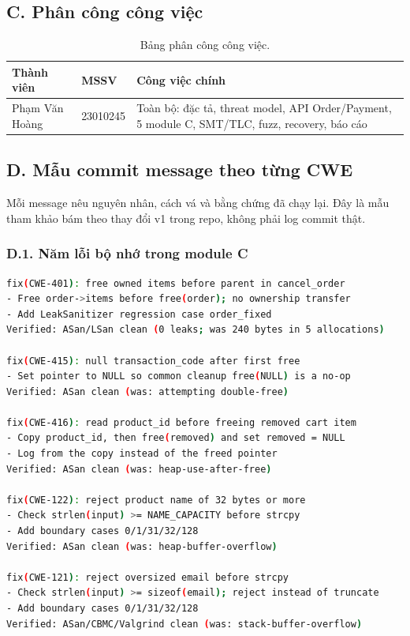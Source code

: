 \documentclass[12pt,a4paper]{article}
\begin{document}
\subsection*{C. Phân công công việc}
\begin{table}[H]
\centering
\small
\renewcommand{\arraystretch}{1.25}
\begin{tabularx}{\textwidth}{@{}L{4.4cm} L{3.2cm} Y@{}}
\toprule
\textbf{Thành viên} & \textbf{MSSV} & \textbf{Công việc chính} \\
\midrule
Phạm Văn Hoàng & 23010245 & Toàn bộ: đặc tả, threat model, API Order/Payment, 5 module C, SMT/TLC, fuzz, recovery, báo cáo \\
\bottomrule
\end{tabularx}
\caption{Bảng phân công công việc.}
\end{table}

\subsection*{D. Mẫu commit message theo từng CWE}
Mỗi message nêu nguyên nhân, cách vá và bằng chứng đã chạy lại. Đây là mẫu tham
khảo bám theo thay đổi v1 trong repo, không phải log commit thật.

\subsubsection*{D.1. Năm lỗi bộ nhớ trong module C}
\begin{lstlisting}[language=bash,caption={Commit mẫu cho CWE-401/415/416/122/121.}]
fix(CWE-401): free owned items before parent in cancel_order
- Free order->items before free(order); no ownership transfer
- Add LeakSanitizer regression case order_fixed
Verified: ASan/LSan clean (0 leaks; was 240 bytes in 5 allocations)

fix(CWE-415): null transaction_code after first free
- Set pointer to NULL so common cleanup free(NULL) is a no-op
Verified: ASan clean (was: attempting double-free)

fix(CWE-416): read product_id before freeing removed cart item
- Copy product_id, then free(removed) and set removed = NULL
- Log from the copy instead of the freed pointer
Verified: ASan clean (was: heap-use-after-free)

fix(CWE-122): reject product name of 32 bytes or more
- Check strlen(input) >= NAME_CAPACITY before strcpy
- Add boundary cases 0/1/31/32/128
Verified: ASan clean (was: heap-buffer-overflow)

fix(CWE-121): reject oversized email before strcpy
- Check strlen(input) >= sizeof(email); reject instead of truncate
- Add boundary cases 0/1/31/32/128
Verified: ASan/CBMC/Valgrind clean (was: stack-buffer-overflow)
\end{lstlisting}
\end{document}
